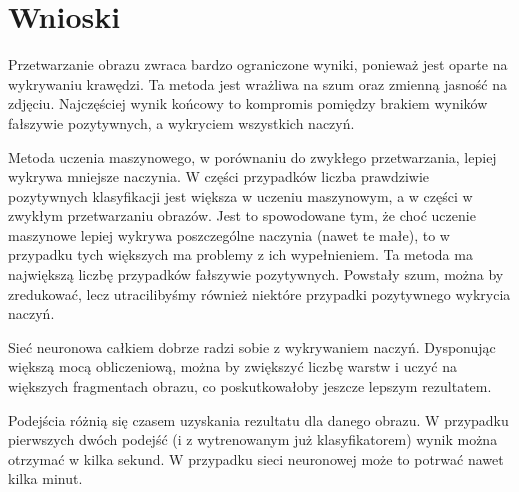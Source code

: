 \documentclass[polish,polish,a4paper]{article}
\begin{document}





	
	\section{Wnioski}
	
	 Przetwarzanie obrazu zwraca bardzo ograniczone wyniki,
	 ponieważ jest oparte na wykrywaniu krawędzi.
	 Ta metoda jest wrażliwa na szum oraz zmienną jasność na zdjęciu.
	 Najczęściej wynik końcowy to kompromis
	 pomiędzy brakiem wyników fałszywie pozytywnych, 
	 a wykryciem wszystkich naczyń.
	 
	 Metoda uczenia maszynowego, 
	 w porównaniu do zwykłego przetwarzania, 
	 lepiej wykrywa mniejsze naczynia.
	 W części przypadków liczba prawdziwie pozytywnych klasyfikacji jest większa w uczeniu maszynowym, 
	 a w części w zwykłym  przetwarzaniu obrazów.
	 Jest to spowodowane tym, 
	 że choć uczenie maszynowe lepiej wykrywa poszczególne naczynia (nawet te małe),
	 to w przypadku tych większych ma problemy z ich wypełnieniem.
	 Ta metoda ma największą liczbę przypadków fałszywie pozytywnych.
	 Powstały szum, można by zredukować, 
	 lecz utracilibyśmy również niektóre przypadki pozytywnego wykrycia naczyń.
	
	Sieć neuronowa całkiem dobrze radzi sobie z wykrywaniem naczyń.
	Dysponując większą mocą obliczeniową,
	można by zwiększyć liczbę warstw i uczyć na większych fragmentach obrazu,
	co poskutkowałoby jeszcze lepszym rezultatem.
	
	Podejścia różnią się czasem uzyskania rezultatu dla danego obrazu.
	W przypadku pierwszych dwóch podejść
	(i z wytrenowanym już klasyfikatorem) wynik można otrzymać
	w kilka sekund. W przypadku sieci neuronowej może to potrwać nawet kilka minut.
		
\end{document}
